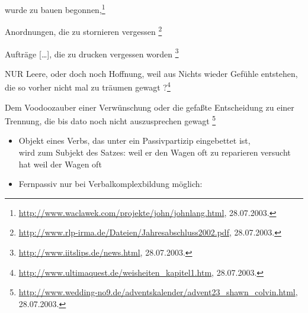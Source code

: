 \ex
{} wurde zu bauen begonnen,\footnote{
\url{http://www.waclawek.com/projekte/john/johnlang.html}, 28.07.2003.
}
\zl

\eal
\ex Anordnungen, die zu stornieren vergessen \footnote{
        \url{http://www.rlp-irma.de/Dateien/Jahresabschluss2002.pdf}, 28.07.2003.
}

\ex Aufträge [\ldots], die zu drucken vergessen worden \footnote{
        \url{http://www.iitslips.de/news.html}, 28.07.2003.
}
\zl

\eal
\ex NUR Leere, oder doch noch Hoffnung, weil aus Nichts wieder Gefühle entstehen,
    die so vorher nicht mal zu träumen gewagt ?\footnote{
        \url{http://www.ultimaquest.de/weisheiten_kapitel1.htm}, 28.07.2003.
}

\ex Dem Voodoozauber einer Verwünschung oder die gefaßte Entscheidung zu einer Trennung,
    die bis dato noch nicht auszusprechen gewagt \footnote{
        \url{http://www.wedding-no9.de/adventskalender/advent23_shawn_colvin.html}, 28.07.2003.
}
\zl
%





\begin{itemize}
\item Objekt eines Verbs, das unter ein Passivpartizip eingebettet ist,\\
wird zum Subjekt des Satzes:
\eal
\ex weil er den Wagen oft zu reparieren versucht hat
\ex weil der Wagen oft 
\zl

\item Fernpassiv nur bei Verbalkomplexbildung möglich:
\eal
{}

\zl
\end{itemize}



